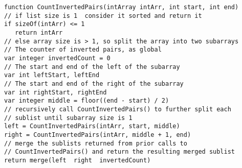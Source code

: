 \documentclass{article}
\begin{document}
\vspace{0.5cm} \texttt{function CountInvertedPairs(intArray intArr, int
start, int end)}\\
\texttt{// if list size is 1\, consider it sorted and return it}\\
\texttt{if sizeOf(intArr) <= 1}\\
\texttt{$\quad$    return intArr}\\
\texttt{// else array size is > 1, so split the array into two subarrays}\\
\texttt{// The counter of inverted pairs, as global}\\
\texttt{var integer invertedCount = 0}\\
\texttt{// The start and end of the left of the subarray }\\
\texttt{var int leftStart, leftEnd }\\
\texttt{// The start and end of the right of the subarray }\\
\texttt{var int rightStart, rightEnd }\\
\texttt{var integer middle = floor((end - start) / 2)}\\
\texttt{// recursively call CountInvertedPairs() to further split each}\\
\texttt{// sublist until subarray size is 1}\\
\texttt{left = CountInvertedPairs(intArr, start, middle)}\\
\texttt{right = CountInvertedPairs(intArr, middle + 1, end)}\\
\texttt{// merge the sublists returned from prior calls to}\\
\texttt{// CountInvertedPairs() and return the resulting merged sublist}\\
\texttt{return merge(left\, right\, invertedCount)}\\
\end{document}
